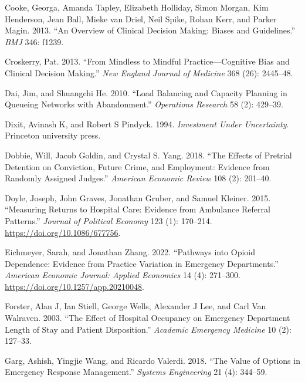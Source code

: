 \documentclass{article}
\newlength{\cslhangindent}
\newlength{\cslentryspacingunit} %
\newenvironment{CSLReferences}[2] %
 {%
  \setlength{\parindent}{0pt}
  \ifodd #1
  \let\oldpar\par
  \def\par{\hangindent=\cslhangindent\oldpar}
  \fi
  \setlength{\parskip}{#2\cslentryspacingunit}
 }%
 {}
\begin{document}
\begin{CSLReferences}{1}{0}
\leavevmode{}%
Cooke, Georga, Amanda Tapley, Elizabeth Holliday, Simon Morgan, Kim
Henderson, Jean Ball, Mieke van Driel, Neil Spike, Rohan Kerr, and
Parker Magin. 2013. {``An Overview of Clinical Decision Making: Biases
and Guidelines.''} \emph{BMJ} 346: f1239.

\leavevmode{}%
Croskerry, Pat. 2013. {``From Mindless to Mindful Practice---Cognitive
Bias and Clinical Decision Making.''} \emph{New England Journal of
Medicine} 368 (26): 2445--48.

\leavevmode{}%
Dai, Jim, and Shuangchi He. 2010. {``Load Balancing and Capacity
Planning in Queueing Networks with Abandonment.''} \emph{Operations
Research} 58 (2): 429--39.

\leavevmode{}%
Dixit, Avinash K, and Robert S Pindyck. 1994. \emph{Investment Under
Uncertainty}. Princeton university press.

\leavevmode{}%
Dobbie, Will, Jacob Goldin, and Crystal S. Yang. 2018. {``The Effects of
Pretrial Detention on Conviction, Future Crime, and Employment: Evidence
from Randomly Assigned Judges.''} \emph{American Economic Review} 108
(2): 201--40.

\leavevmode{}%
Doyle, Joseph, John Graves, Jonathan Gruber, and Samuel Kleiner. 2015.
{``Measuring Returns to Hospital Care: Evidence from Ambulance Referral
Patterns.''} \emph{Journal of Political Economy} 123 (1): 170--214.
\url{https://doi.org/10.1086/677756}.

\leavevmode{}%
Eichmeyer, Sarah, and Jonathan Zhang. 2022. {``Pathways into Opioid
Dependence: Evidence from Practice Variation in Emergency
Departments.''} \emph{American Economic Journal: Applied Economics} 14
(4): 271--300. \url{https://doi.org/10.1257/app.20210048}.

\leavevmode{}%
Forster, Alan J, Ian Stiell, George Wells, Alexander J Lee, and Carl Van
Walraven. 2003. {``The Effect of Hospital Occupancy on Emergency
Department Length of Stay and Patient Disposition.''} \emph{Academic
Emergency Medicine} 10 (2): 127--33.

\leavevmode{}%
Garg, Ashish, Yingjie Wang, and Ricardo Valerdi. 2018. {``The Value of
Options in Emergency Response Management.''} \emph{Systems Engineering}
21 (4): 344--59.


\end{CSLReferences}
\end{document}
